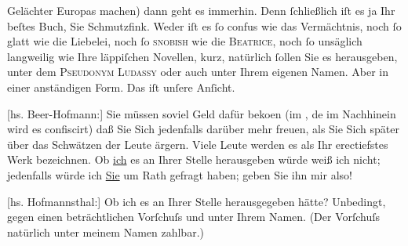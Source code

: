                Gelächter Europas machen) dann geht es immerhin.
               Denn{ }ſchließlich {\pb}iſt es ja Ihr
               beſtes Buch, Sie Schmutzfink.
               Weder iſt es{ }ſo confus wie das Vermächtnis, noch{ }ſo glatt wie die Liebelei, noch{ }ſo \textsc{snobish} wie die \textsc{Beatrice}, noch{ }ſo unsäglich langweilig wie Ihre läppiſchen Novellen, kurz, natürlich{ }ſollen Sie es herausgeben, unter dem \textsc{Pseudonym}{ }\textsc{Ludassy} oder auch unter Ihrem eigenen Namen. Aber in einer {\pb}anständigen Form. Das iſt unſere
               Anſicht.\pend
           
\pstart
           {[}hs. Beer-Hofmann:{]} Sie müssen soviel Geld dafür beko{\geminationm}en (im , de{\geminationn} im Nachhinein wird es confiscirt) daß Sie Sich
               jedenfalls darüber mehr freuen, als Sie Sich später über das Schwätzen der Leute
               ärgern. Viele Leute werden es als Ihr erectiefstes Werk bezeichnen. Ob \uline{ich} es an Ihrer Stelle herausgeben würde weiß ich nicht;
               jedenfalls würde ich \uline{Sie} um Rath gefragt haben; geben
               Sie ihn mir also!\pend
           
\pstart
           {[}hs. Hofmannsthal:{]} Ob ich es an Ihrer Stelle herausgegeben hätte?
               Unbedingt, gegen einen beträchtlichen Vorſchuſs und unter Ihrem Namen. (Der Vorſchuſs
               natürlich unter meinem Namen zahlbar.)\pend
           

